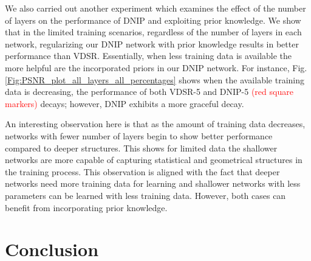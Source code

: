 \documentclass[9pt]{article}
\def\tcr{\textcolor{red}}
\begin{document}
We also carried out another experiment which examines the effect of the number of layers on the performance of DNIP and exploiting prior knowledge. We show that in the limited training scenarios, regardless of the number of layers in each network, regularizing our DNIP network with prior knowledge results in better performance than VDSR. Essentially, when less training data is available the more helpful are the incorporated priors in our DNIP network. For instance, Fig. \ref{Fig:PSNR_plot_all_layers_all_percentages}  shows when the available training data is decreasing, the performance of both VDSR-5 and DNIP-5 \tcr{(red square markers)} decays; however, DNIP exhibits a more graceful decay.



An interesting observation here is that as the amount of training data decreases, networks with fewer number of layers begin to show better performance compared to deeper structures. This shows for limited data the shallower networks are more capable of capturing statistical and geometrical structures in the training process. This observation is aligned with the fact that deeper networks need more training data for learning and shallower networks with less parameters can be learned with less training data. However, both cases can benefit from incorporating prior knowledge.





\section{Conclusion}
\end{document}
